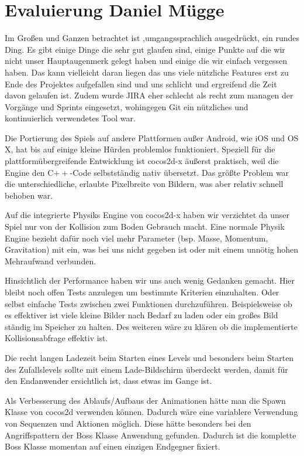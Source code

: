 \chapter[Evaluierung]{Evaluierung \small Daniel Mügge}\label{ch:eval}

Im Großen und Ganzen betrachtet ist \gamename ,umgangssprachlich ausgedrückt, ein rundes Ding.
Es gibt einige Dinge die sehr gut glaufen sind, einige Punkte auf die wir nicht unser Hauptaugenmerk gelegt haben und einige die wir einfach vergessen haben. Das kann vielleicht daran liegen das uns viele nützliche Features erst zu Ende des Projektes aufgefallen sind und uns schlicht und ergreifend die Zeit davon gelaufen ist. Zudem wurde JIRA eher schlecht als recht zum managen der Vorgänge und Sprints eingesetzt, wohingegen Git ein nützliches und kontinuierlich verwendetes Tool war.

Die Portierung des Spiels auf andere Plattformen außer Android, wie iOS und OS X, hat bis auf einige kleine Hürden problemlos funktioniert. Speziell für die plattformübergreifende Entwicklung ist cocos2d-x äußerst praktisch, weil die Engine den C$++$-Code selbstständig nativ übersetzt.
Das größte Problem war die unterschiedliche, erlaubte Pixelbreite von Bildern, was aber relativ schnell behoben war.

Auf die integrierte Physiks Engine von cocos2d-x haben wir verzichtet da unser Spiel nur von der Kollision zum Boden Gebrauch macht. Eine normale Physik Engine bezieht dafür noch viel mehr Parameter (bsp. Masse, Momentum, Gravitation) mit ein, was bei uns nicht gegeben ist oder mit einem unnötig hohen Mehraufwand verbunden.

Hinsichtlich der Performance haben wir uns auch wenig Gedanken gemacht. Hier bleibt noch offen Tests anzulegen um bestimmte Kriterien einzuhalten. Oder selbst einfache Tests zwischen zwei Funktionen durchzuführen. Beispielsweise ob es effektiver ist viele kleine Bilder nach Bedarf zu laden oder ein großes Bild ständig im Speicher zu halten. Des weiteren wäre zu klären ob die implementierte Kollisionsabfrage effektiv ist.

Die recht langen Ladezeit beim Starten eines Levels und besonders beim Starten des Zufallslevels sollte mit einem Lade-Bildschirm überdeckt werden, damit für den Endanwender ersichtlich ist, dass etwas im Gange ist.

Als Verbesserung des Ablaufs/Aufbaus der Animationen hätte man die Spawn Klasse von cocos2d verwenden können. Dadurch wäre eine variablere Verwendung von Sequenzen und Aktionen möglich. Diese hätte besonders bei den Angriffspattern der Boss Klasse Anwendung gefunden. Dadurch ist die komplette Boss Klasse momentan auf einen einzigen Endgegner fixiert.

